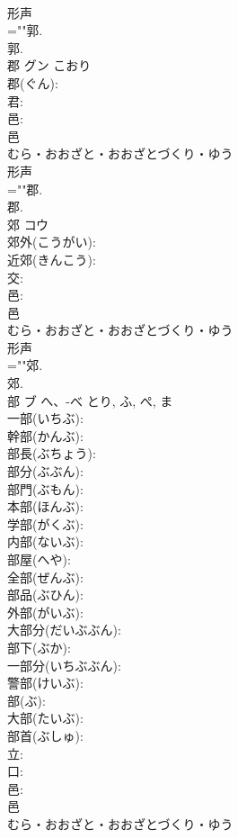 \documentclass[8pt]{extreport}
\begin{document}
\begin{CJK}{UTF8}{min}
\\	形声 
\\	=""郭.
\\	郭.
\\	郡	グン	こおり		
\\	郡(ぐん): 
\\	君: 
\\	邑: 
\\	邑	
\\	むら・おおざと・おおざとづくり・ゆう	
\\	形声 
\\	=""郡.
\\	郡.
\\	郊	コウ			
\\	郊外(こうがい): 
\\	近郊(きんこう): 
\\	交: 
\\	邑: 
\\	邑	
\\	むら・おおざと・おおざとづくり・ゆう	
\\	形声 
\\	=""郊.
\\	郊.
\\	部	ブ	へ、-べ	とり, ふ, ぺ, ま	
\\	一部(いちぶ): 
\\	幹部(かんぶ): 
\\	部長(ぶちょう): 
\\	部分(ぶぶん): 
\\	部門(ぶもん): 
\\	本部(ほんぶ): 
\\	学部(がくぶ): 
\\	内部(ないぶ): 
\\	部屋(へや): 
\\	全部(ぜんぶ): 
\\	部品(ぶひん): 
\\	外部(がいぶ): 
\\	大部分(だいぶぶん): 
\\	部下(ぶか): 
\\	一部分(いちぶぶん): 
\\	警部(けいぶ): 
\\	部(ぶ): 
\\	大部(たいぶ): 
\\	部首(ぶしゅ): 
\\	立: 
\\	口: 
\\	邑: 
\\	邑	
\\	むら・おおざと・おおざとづくり・ゆう	

\end{CJK}
\end{document}
